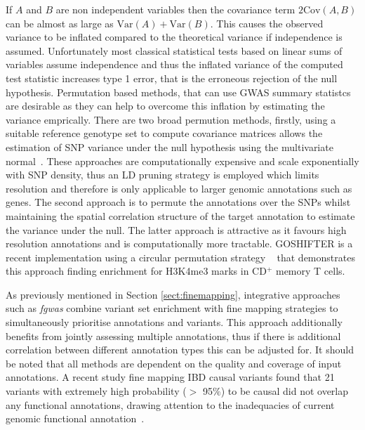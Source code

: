 \documentclass[a4paper,11pt]{report}
\begin{document}
If $A$ and $B$ are non independent variables then the covariance term $2\text{Cov}(A,B)$ can be almost as large as $\text{Var}(A) + \text{Var}(B)$. This causes the observed variance to be inflated compared to the theoretical variance if independence is assumed. Unfortunately most classical statistical tests based on linear sums of variables assume independence and thus the inflated variance of the computed test statistic increases type 1 error, that is the erroneous rejection of the null hypothesis. Permutation based methods, that can use GWAS summary statistcs are desirable as they can help to overcome this inflation by estimating the variance emprically. There are two broad permution methods, firstly, using a suitable reference genotype set to compute covariance matrices allows the estimation of SNP variance under the null hypothesis using the multivariate normal~\citep{LiuMcRaeNyholtEtAl2010,Burren2014-vh}. These approaches are computationally expensive and scale exponentially with SNP density, thus an LD pruning strategy is employed which limits resolution and therefore is only applicable to larger genomic annotations such as genes. The second approach is to permute the annotations over the SNPs whilst maintaining the spatial correlation structure of the target annotation to estimate the variance under the null. The latter approach is attractive as it favours high resolution annotations and is computationally more tractable. GOSHIFTER is a recent implementation using a circular permutation strategy ~\citep{Trynka2015-wz} that demonstrates this approach finding enrichment for H3K4me3 marks in CD$^{+}$ memory T cells. 

As previously mentioned in Section \ref{sect:finemapping}, integrative approaches such as \textit{fgwas} combine variant set enrichment with fine mapping strategies to simultaneously prioritise annotations and variants. This approach additionally benefits from jointly assessing multiple annotations, thus if there is additional correlation between different annotation types this can be adjusted for.  It should be noted that all methods are dependent on the quality and coverage of input annotations. A recent study fine mapping IBD causal variants found that 21 variants with extremely high probability ($>$ 95$\%$) to be causal did not overlap any functional annotations, drawing attention to the inadequacies of current genomic functional annotation~\citep{Huang2015-ug}.
\end{document}
